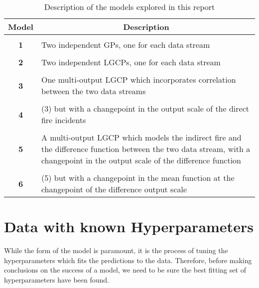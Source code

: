 \documentclass[a4paper,11pt]{report}
\begin{document}
\begin{table}[]
\caption{Description of the models explored in this report}
\label{tab:model-description}
\centering
\begin{tabular}{c|p{14cm}}
\textbf{Model} & \multicolumn{1}{c}{\textbf{Description}}                                                                                                                                                          \\ \hline
& \\
\bf{1}              & Two independent GPs, one for each data stream                                                                                                                                 \\
& \\
\bf{2}              & Two independent LGCPs, one for each data stream                                                                                                                               \\
& \\
\bf{3}              & One multi-output LGCP which incorporates correlation between the two data streams                                                                                             \\
& \\
\bf{4}              & (3) but with a changepoint in the output scale of the direct fire incidents                                                                                                   \\
& \\
\bf{5}              & A multi-output LGCP which models the indirect fire and the difference function between the two data stream, with a changepoint in the output scale of the difference function \\
& \\
\bf{6}              & (5) but with a changepoint in the mean function at the changepoint of the difference output scale                                                                            
\end{tabular}
\end{table}

\section{Data with known Hyperparameters}

While the form of the model is paramount, it is the process of tuning the hyperparameters which fits the predictions to the data. Therefore, before making conclusions on the success of a model, we need to be sure the best fitting set of hyperparameters have been found.
\end{document}
